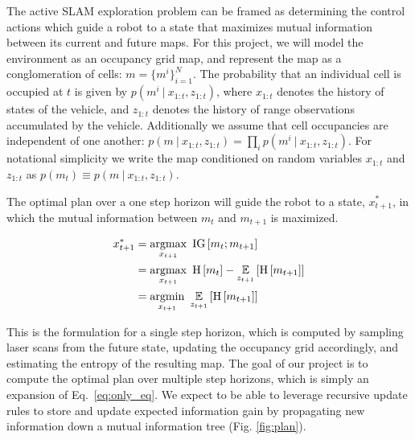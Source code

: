 The active SLAM exploration problem can be framed as determining the control actions which guide a robot to a state that maximizes mutual information between its current and future maps. For this project, we will model the environment as an occupancy grid map, and represent the map as a conglomeration of cells: $m = \{m^{i}\}_{i=1}^{N}$. The probability that an individual cell is occupied at $t$ is given by $p\left(m^{i} \ \vert \ x_{1:t}, z_{1:t}\right)$, where $x_{1:t}$ denotes the history of states of the vehicle, and $z_{1:t}$ denotes the history of range observations accumulated by the vehicle. Additionally we assume that cell occupancies  are independent of one another: $p\left(m \ \vert \ x_{1:t}, z_{1:t}\right) = \prod_{i} p\left(m^{i} \ \vert \ x_{1:t}, z_{1:t}\right)$. For notational simplicity we write the map conditioned on random variables $x_{1:t}$ and $z_{1:t}$ as $p\left(m_{t}\right) \equiv p\left(m \ \vert \ x_{1:t}, z_{1:t}\right)$.

The optimal plan over a one step horizon will guide the robot to a state, $x_{t+1}^{*}$, in which the mutual information between $m_{t}$ and $m_{t+1}$ is maximized.

\begin{align} \begin{split}
    x_{t+1}^{*}
    &=
    \argmax_{x_{t+1}}
    \
    \text{IG}\left[
        m_{t}
        ;
        m_{t+1}
    \right]
    \\
    &=
    \argmax_{x_{t+1}}
    \
    \text{H}\left[
        m_{t}
    \right]
    -
    \expect_{z_{t+1}}\left[
        \text{H}\left[
            m_{t+1}
        \right]
    \right]
    \\
    &=
    \argmin_{x_{t+1}}
    \
    \expect_{z_{t+1}}\left[
        \text{H}\left[
            m_{t+1}
        \right]
    \right]
\end{split}
\label{eq:only_eq}
\end{align}

This is the formulation for a single step horizon, which is computed by sampling laser scans from the future state, updating the occupancy grid accordingly, and estimating the entropy of the resulting map. The goal of our project is to compute the optimal plan over multiple step horizons, which is simply an expansion of Eq.~\eqref{eq:only_eq}. We expect to be able to leverage recursive update rules to store and update expected information gain by propagating new information down a mutual information tree (Fig. \ref{fig:plan}).
